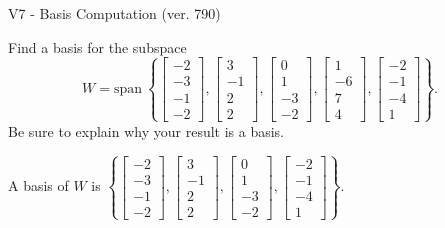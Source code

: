 \begin{exercise}
  \begin{exerciseTitle}V7 - Basis Computation (ver. 790)\end{exerciseTitle}
  \begin{exerciseStatement}
    Find a basis for the subspace 
\[W=\mathrm{span}\ \left\{\left[\begin{array}{r}
-2 \\
-3 \\
-1 \\
-2
\end{array}\right] , \left[\begin{array}{r}
3 \\
-1 \\
2 \\
2
\end{array}\right] , \left[\begin{array}{r}
0 \\
1 \\
-3 \\
-2
\end{array}\right] , \left[\begin{array}{r}
1 \\
-6 \\
7 \\
4
\end{array}\right] , \left[\begin{array}{r}
-2 \\
-1 \\
-4 \\
1
\end{array}\right]\right\}.\]
 Be sure to explain why your result is a basis.


  \end{exerciseStatement}
  \begin{exerciseAnswer}
   A basis of \(W\) is  \(\left\{\left[\begin{array}{r}
-2 \\
-3 \\
-1 \\
-2
\end{array}\right] , \left[\begin{array}{r}
3 \\
-1 \\
2 \\
2
\end{array}\right] , \left[\begin{array}{r}
0 \\
1 \\
-3 \\
-2
\end{array}\right] , \left[\begin{array}{r}
-2 \\
-1 \\
-4 \\
1
\end{array}\right]\right\}\).
  


  \end{exerciseAnswer}
\end{exercise}